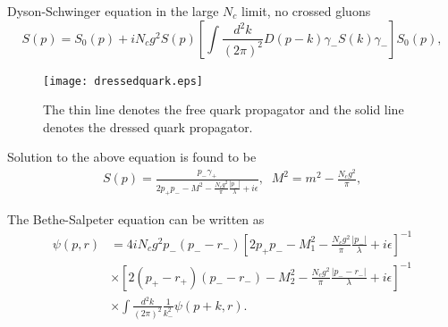 \documentclass[8pt]{beamer}
\begin{document}
\begin{frame}
	Dyson-Schwinger equation in the large $N_c$ limit, no crossed gluons
	\begin{equation}
		S(p)=S_0(p)+i N_c g^2
		S(p)\left[\int\frac{d^2k}{(2\pi)^2}D(p-k)\gamma_{-}S(k)\gamma_{-}\right]S_{0}(p),
	\end{equation}
	\begin{figure}[hbt]
		\begin{center}
			\texttt{[image: dressedquark.eps]}\\
			\caption{The thin line denotes the free quark propagator and the solid line denotes the dressed quark propagator.}\label{dressedquark}
		\end{center}
	\end{figure}
	Solution to the above equation is found to be
	\begin{eqnarray}
		S(p)=\frac{p_{-}\gamma_{+}}{2p_{+}p_{-}-M^2-\frac{N_c
			g^2}{\pi}\frac{|p_{-}|}{\lambda}+i\epsilon}, \;\;
		M^2=m^2-\frac{N_c g^2}{\pi},
	\end{eqnarray}

	The Bethe-Salpeter equation can be written as
	\begin{align}
		\psi(p,r) & =4iN_c g^2 p_{-}(p_{-}-r_{-})
		[2p_{+}p_{-}-M_1^2-\frac{N_cg^2}{\pi}\frac{|p_{-}|}{\lambda}+i\epsilon]^{-1}\nonumber\\
		          & \times [2(p_{+}-r_{+})(p_{-}-r_{-})-M_2^2-\frac{N_c
			g^2}{\pi}\frac{|p_{-}-r_{-}|}{\lambda}+i\epsilon]^{-1}\nonumber\\&
		\times
		\int\frac{d^2k}{(2\pi)^2}\frac{1}{k_{-}^2}\psi(p+k,r).\label{BS}
	\end{align}
\end{frame}
\end{document}
